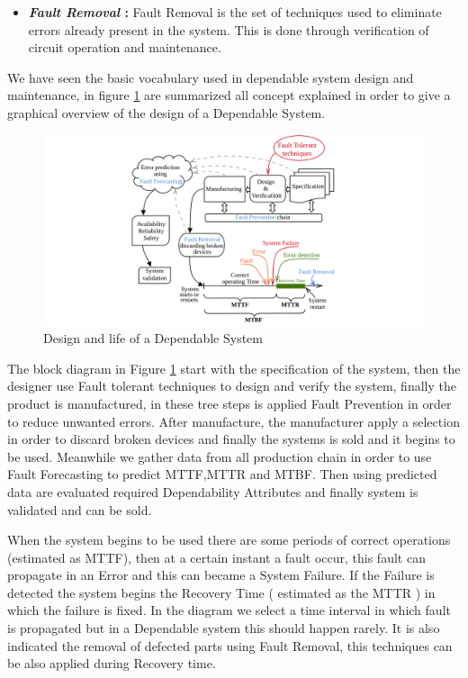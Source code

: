 {{{{\begin{itemize}
					\item \textbf{\textit{Fault Removal} : } Fault Removal is the set of techniques used to eliminate errors already present in the system. This is done through verification of circuit operation and maintenance.
				\end{itemize}     	
			} %
			We have seen the basic vocabulary used in dependable system design and maintenance, in figure \ref{fig:dependability1} are summarized all concept explained in order to give a graphical overview of the design of a Dependable System.  
			\begin{figure}[H]
				\centering
				\includegraphics[scale=0.26,center]{./images/Dependability1.png}
				\caption{Design and life of a Dependable System}
				\label{fig:dependability1}
			\end{figure} 
			The block diagram in Figure \ref{fig:dependability1} start with the specification of the system, then the designer use Fault tolerant techniques to design and verify the system, finally the product is manufactured, in these tree steps is applied Fault Prevention in order to reduce unwanted errors. After manufacture, the manufacturer apply a selection in order to discard broken devices and finally the systems is sold and it begins to be used. Meanwhile we gather data from all production chain in order to use Fault Forecasting to predict MTTF,MTTR and MTBF. Then using predicted data are evaluated required Dependability Attributes and finally system is validated and can be sold.
			
			When the system begins to be used there are some periods of correct operations (estimated as MTTF), then at a certain instant a fault occur, this fault can propagate in an Error and this can became a System Failure. If the Failure is detected the system begins the Recovery Time ( estimated as the MTTR ) in which the failure is fixed. In the diagram we select a time interval in which fault is propagated but in a Dependable system this should happen rarely. It is also indicated the removal of defected parts using Fault Removal, this techniques can be also applied during Recovery time.  
			     
}}}
